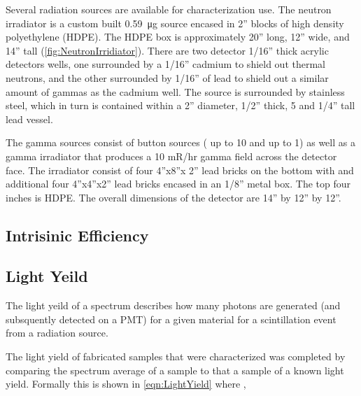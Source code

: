 Several radiation sources are available for characterization use.
The neutron irradiator is a custom built \SI{0.59}{\ug}  source encased in 2” blocks of high density polyethylene (HDPE). 
The HDPE box is approximately 20” long, 12” wide, and 14” tall (\autoref{fig:NeutronIrridiator}). 
There are two detector 1/16” thick acrylic detectors wells, one surrounded by a 1/16” cadmium to shield out thermal neutrons, and the other surrounded by 1/16” of lead to shield out a similar amount of gammas as the cadmium well.
The  source is surrounded by stainless steel, which in turn is contained within a 2” diameter, 1/2” thick, 5 and 1/4” tall lead vessel.
\begin{figure}
  \centering
  \label{fig:NeutronIrridiator}
\end{figure}
The gamma sources consist of button sources ( up to \SI{10}{\uCi} and  up to \SI{1}{\uCi}) as well as a gamma irradiator that produces a 10 mR/hr gamma field across the detector face. 
The irradiator consist of four 4”x8”x 2” lead bricks on the bottom with and additional four 4”x4”x2” lead bricks encased in an 1/8” metal box. 
The top four inches is HDPE. 
The overall dimensions of the detector are 14” by 12” by 12”. 

\subsection{Intrisinic Efficiency}

\subsection{Light Yeild}
The light yeild of a spectrum describes how many photons are generated (and subsquently detected on a PMT) for a given material for a scintillation event from a radiation source.

The light yield of fabricated samples that were characterized was completed by comparing the spectrum average of a sample to that a sample of a known light yield.
Formally this is shown in \eqref{eqn:LightYield} where , 

